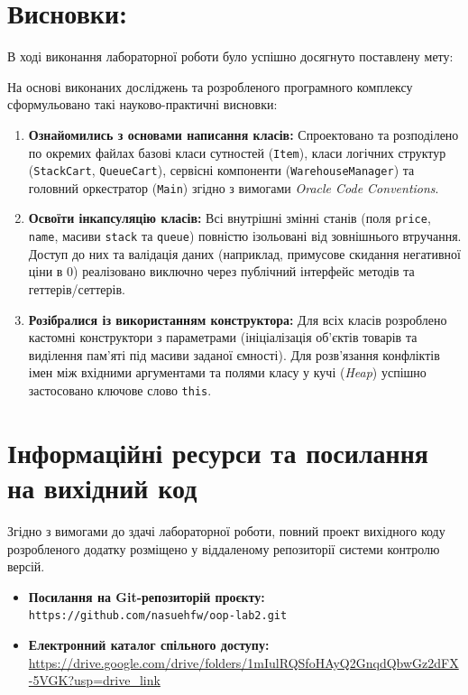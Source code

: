 \section{Висновки:}

В ході виконання лабораторної роботи було успішно досягнуто поставлену мету: 

На основі виконаних досліджень та розробленого програмного комплексу сформульовано такі 
науково-практичні висновки:
\begin{enumerate}
    \item \textbf{Ознайомились з основами написання класів: } 
    Спроектовано та розподілено по окремих файлах базові класи сутностей (\texttt{Item}), 
    класи логічних структур (\texttt{StackCart}, \texttt{QueueCart}), сервісні компоненти 
    (\texttt{WarehouseManager}) та головний оркестратор (\texttt{Main}) згідно з вимогами
     \textit{Oracle Code Conventions}. \\
    \item \textbf{Освоїти інкапсуляцію класів:} 
    Всі внутрішні змінні станів (поля \texttt{price}, \texttt{name}, масиви 
    \texttt{stack} та \texttt{queue}) повністю ізольовані від зовнішнього втручання. 
    Доступ до них та валідація даних (наприклад, примусове скидання негативної ціни в 0) 
    реалізовано виключно через публічний інтерфейс методів та геттерів/сеттерів. \\
        
    \item \textbf{Розібралися із використанням конструктора:} 
    Для всіх класів розроблено кастомні конструктори з параметрами (ініціалізація об'єктів 
    товарів та виділення пам'яті під масиви заданої ємності). Для розв'язання конфліктів імен 
    між вхідними аргументами та полями класу у кучі (\textit{Heap}) успішно застосовано 
    ключове слово \texttt{this}. \\ 
    
\end{enumerate}


\newpage
\section{Інформаційні ресурси та посилання на вихідний код}

Згідно з вимогами до здачі лабораторної роботи, повний проект вихідного коду розробленого 
додатку розміщено у віддаленому репозиторії системи контролю версій. 

\begin{itemize}
    \item \textbf{Посилання на Git-репозиторій проєкту:} \\
    \texttt{https://github.com/nasuehfw/oop-lab2.git} %
    \item \textbf{Електронний каталог спільного доступу:} \\
    \url{https://drive.google.com/drive/folders/1mIulRQSfoHAyQ2GnqdQbwGz2dFX-5VGK?usp=drive\_link}
\end{itemize}

